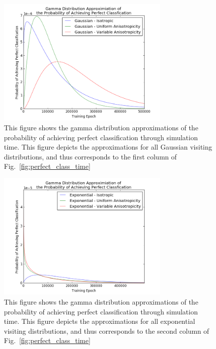 \documentclass[10pt,journal,cspaper,compsoc]{IEEEtran}
\begin{document}
\begin{figure} 
	\includegraphics[width = 3.3in, trim={0.5cm 0 1.2cm 0.0cm},clip]{figures/gammaDists/gamma_g.png}
	\caption{This figure shows the gamma distribution approximations of the probability of achieving perfect classification through simulation time. This figure depicts the approximations for all Gaussian visiting distributions, and thus corresponds to the first column of Fig.~\ref{fig:perfect_class_time}}
	\label{fig:gaussian_gamma}
\end{figure}

\begin{figure} 
	\includegraphics[width = 3.3in, trim={0.5cm 0 1.2cm 0.0cm},clip]{figures/gammaDists/gamma_e.png}
	\caption{This figure shows the gamma distribution approximations of the probability of achieving perfect classification through simulation time. This figure depicts the approximations for all  exponential visiting distributions, and thus corresponds to the second column of Fig.~\ref{fig:perfect_class_time}}
	\label{fig:exp_gamma}
\end{figure}
\end{document}
